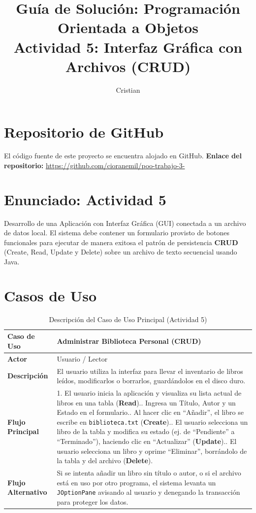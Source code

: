 \documentclass[12pt,a4paper]{article}
\title{\textbf{Guía de Solución: Programación Orientada a Objetos} \\ \large Actividad 5: Interfaz Gráfica con Archivos (CRUD)}
\author{Cristian}
\date{}
\begin{document}
\maketitle

\section{Repositorio de GitHub}
El código fuente de este proyecto se encuentra alojado en GitHub. 
\newline
\textbf{Enlace del repositorio:} \url{https://github.com/cioranemil/poo-trabajo-3-}

\section{Enunciado: Actividad 5}
Desarrollo de una Aplicación con Interfaz Gráfica (GUI) conectada a un archivo de datos local. El sistema debe contener un formulario provisto de botones funcionales para ejecutar de manera exitosa el patrón de persistencia \textbf{CRUD} (Create, Read, Update y Delete) sobre un archivo de texto secuencial usando Java.

\section{Casos de Uso}
\begin{table}[h]
    \centering
    \begin{tabular}{|p{3cm}|p{12cm}|}
    \hline
    \textbf{Caso de Uso} & \textbf{Administrar Biblioteca Personal (CRUD)} \\ \hline
    \textbf{Actor} & Usuario / Lector \\ \hline
    \textbf{Descripción} & El usuario utiliza la interfaz para llevar el inventario de libros leídos, modificarlos o borrarlos, guardándolos en el disco duro. \\ \hline
    \textbf{Flujo Principal} & 
    1. El usuario inicia la aplicación y visualiza su lista actual de libros en una tabla (\textbf{Read}).\newline
    2. Ingresa un Título, Autor y un Estado en el formulario.\newline
    3. Al hacer clic en ``Añadir'', el libro se escribe en \texttt{biblioteca.txt} (\textbf{Create}).\newline
    4. El usuario selecciona un libro de la tabla y modifica su estado (ej. de ``Pendiente'' a ``Terminado''), haciendo clic en ``Actualizar'' (\textbf{Update}).\newline
    5. El usuario selecciona un libro y oprime ``Eliminar'', borrándolo de la tabla y del archivo (\textbf{Delete}). \\ \hline
    \textbf{Flujo Alternativo} & 
    Si se intenta añadir un libro sin título o autor, o si el archivo está en uso por otro programa, el sistema levanta un \texttt{JOptionPane} avisando al usuario y denegando la transacción para proteger los datos. \\ \hline
    \end{tabular}
    \caption{Descripción del Caso de Uso Principal (Actividad 5)}
\end{table}
\end{document}
